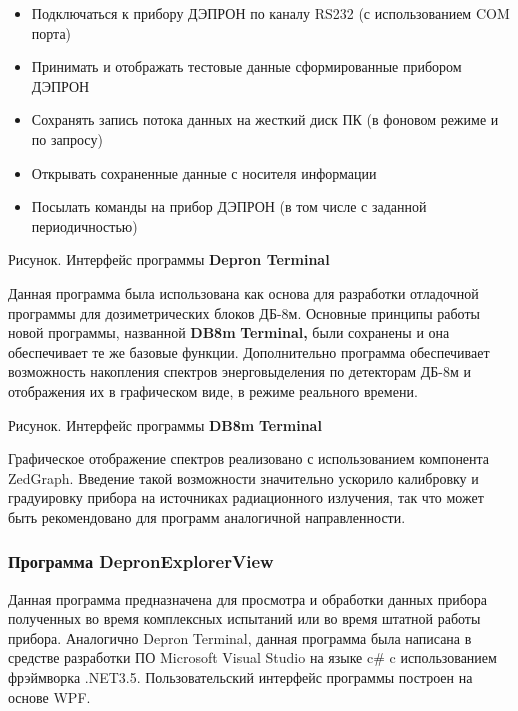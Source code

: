\documentclass[a4paper,portrait,12pt]{article}
\begin{document}
{{{{\begin{itemize}
\item 	Подключаться к прибору ДЭПРОН по каналу RS232 (с использованием COM порта)


\item 	Принимать и отображать тестовые данные сформированные прибором ДЭПРОН


\item 	Сохранять запись потока данных на жесткий диск ПК (в фоновом режиме и по запросу)


\item 	Открывать сохраненные данные с носителя информации


\item 	Посылать команды на прибор ДЭПРОН (в том числе с заданной периодичностью)


\end{itemize}
 Рисунок. Интерфейс программы \textbf{Depron Terminal}





Данная программа была использована как основа для разработки отладочной программы для дозиметрических блоков ДБ-8м. Основные принципы работы новой программы, названной \textbf{DB}\textbf{8}\textbf{m}\textbf{ }\textbf{Terminal}\textbf{,} были сохранены и она обеспечивает те же базовые функции. Дополнительно программа обеспечивает возможность накопления спектров энерговыделения по детекторам ДБ-8м и отображения их в графическом виде, в режиме реального времени. 





Рисунок. Интерфейс программы \textbf{DB}\textbf{8}\textbf{m}\textbf{ }\textbf{Terminal}


Графическое отображение спектров реализовано с использованием компонента ZedGraph. Введение такой возможности значительно ускорило калибровку и градуировку прибора на источниках радиационного излучения, так что может быть рекомендовано для программ аналогичной направленности.


\subsubsection*{\textbf{Программа DepronExplorerView}}

Данная программа предназначена для просмотра и обработки данных прибора полученных во время комплексных испытаний или во время штатной работы прибора. Аналогично Depron Terminal, данная программа была написана в средстве разработки ПО Microsoft Visual Studio на языке c\# c использованием фрэймворка .NET3.5. Пользовательский интерфейс программы построен на основе WPF.


}}}}
\end{document}
